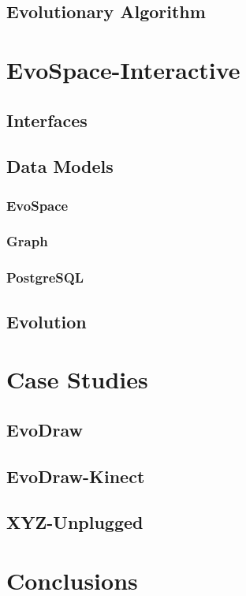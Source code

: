   \subsection{Evolutionary Algorithm}


\section{EvoSpace-Interactive}
  \subsection{Interfaces}
  \subsection{Data Models}
    \subsubsection{EvoSpace}
    \subsubsection{Graph}
    \subsubsection{PostgreSQL}
  \subsection{Evolution}

\section{Case Studies}
\subsection{EvoDraw}
\subsection{EvoDraw-Kinect}
\subsection{XYZ-Unplugged}


\section{Conclusions}

\begin{acks}


\end{acks}
